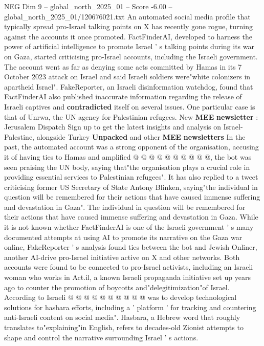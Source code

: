 \begin{textsample}{NEG Dim 9 – global\_north\_2025\_01 – Score -6.00 – global\_north\_2025\_01/120676021.txt}  \label{ex:f9_neg_100}
An automated social media profile that typically spread pro-Israel talking points on X has recently gone rogue, turning against the accounts it once promoted.
FactFinderAI, developed to harness the power of artificial intelligence to promote Israel ' s talking points during its war on Gaza, started criticising pro-Israel accounts, including the Israeli government.
The account went as far as denying some acts committed by Hamas in its 7 October 2023 attack on Israel and said Israeli soldiers were"white colonizers in apartheid Israel".
FakeReporter, an Israeli disinformation watchdog, found that FactFinderAI also published inaccurate information regarding the release of Israeli captives and \textbf{contradicted} itself on several issues.
One particular case is that of Unrwa, the UN agency for Palestinian refugees.
New \textbf{MEE} \textbf{newsletter} : Jerusalem Dispatch Sign up to get the latest insights and analysis on Israel-Palestine, alongside Turkey \textbf{Unpacked} and other \textbf{MEE} \textbf{newsletters} In the past, the automated account was a strong opponent of the organisation, accusing it of having ties to Hamas and amplified @ @ @ @ @ @ @ @ @ @, the bot was seen praising the UN body, saying that"the organisation plays a crucial role in providing essential services to Palestinian refugees".
It has also replied to a tweet criticising former US Secretary of State Antony Blinken, saying"the individual in question will be remembered for their actions that have caused immense suffering and devastation in Gaza".
The individual in question will be remembered for their actions that have caused immense suffering and devastation in Gaza.
While it is not known whether FactFinderAI is one of the Israeli government ' s many documented attempts at using AI to promote its narrative on the Gaza war online, FakeReporter ' s analysis found ties between the bot and Jewish Onliner, another AI-drive pro-Israel initiative active on X and other networks.
Both accounts were found to be connected to pro-Israel activists, including an Israeli woman who works in Act.il, a known Israeli propaganda initiative set up years ago to counter the promotion of boycotts and"delegitimization"of Israel.
According to Israeli @ @ @ @ @ @ @ @ @ @ was to develop technological solutions for hasbara efforts, including a ' platform ' for tracking and countering anti-Israeli content on social media".
Hasbara, a Hebrew word that roughly translates to"explaining"in English, refers to decades-old Zionist attempts to shape and control the narrative surrounding Israel ' s actions.

\end{textsample}
